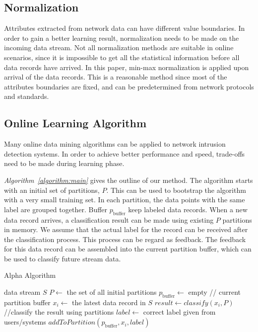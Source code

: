 \documentclass[runningheads]{llncs}
\begin{document}
	\subsection{Normalization}

	Attributes extracted from network data can have different value boundaries. In order to gain a better learning result, normalization needs to be made on the incoming data stream. Not all normalization methods are suitable in online scenarios, since it is impossible to get all the statistical information before all data records have arrived. In this paper, min-max normalization is applied upon arrival of the data records. This is a reasonable method since most of the attributes boundaries are fixed, and can be predetermined from network protocols and standards.
	
	\subsection{Online Learning Algorithm}

	Many online data mining algorithms can be applied to network intrusion detection systems. In order to achieve better performance and speed, trade-offs need to be made during learning phase.
	
	\textit{Algorithm~\ref{algorithm:main}} gives the outline of our method. The algorithm starts with an initial set of partitions, $P$. This can be used to bootstrap the algorithm with a very small training set. In each partition, the data points with the same label are grouped together. Buffer $p_\text{buffer}$ keep labeled data records. When a new data record arrives, a classification result can be made using existing $P$ partitions in memory. We assume that the actual label for the record can be received after the classification process. This process can be regard as feedback. The feedback for this data record can be assembled into the current partition buffer, which can be used to classify future stream data.
	
	\begin{algorithm}
		\caption{Alpha Algorithm} \label{algorithm:main}
		\begin{algorithmic}
			\REQUIRE data stream $S$
			\STATE $P \gets$ the set of all initial partitions
			\STATE $p_\text{buffer} \gets$ empty // current partition buffer
			\STATE $x_i \gets $ the latest data record in $S$
			\STATE $result \gets classify(x_i, P)$ //classify the result using partitions
			\STATE $label \gets$ correct label given from users/systems
			\STATE $addToPartition(p_\text{buffer}, x_i, label)$ 
			\ENDWHILE
		\end{algorithmic}
	\end{algorithm}
	
\end{document}
